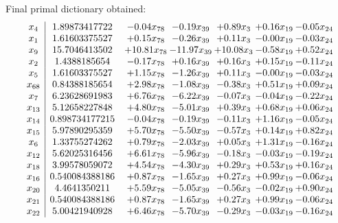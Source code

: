 \documentclass[8pt]{article}
\begin{document}
 Final primal dictionary obtained: 
\[\begin{array}{c| c c@{\hskip 2pt} c@{\hskip 2pt} c@{\hskip 2pt} c@{\hskip 2pt} c@{\hskip 2pt} }
 x_{4}   &  1.89873417722 & -0.04 x_{78} & -0.19 x_{39} & +  0.89 x_{3} & +  0.16 x_{19} & -0.05 x_{24}\\
 x_{1}   &  1.61603375527 & +  0.15 x_{78} & -0.26 x_{39} & +  0.11 x_{3} & -0.00 x_{19} & -0.03 x_{24}\\
 x_{9}   &  15.7046413502 & + 10.81 x_{78} & -11.97 x_{39} & + 10.08 x_{3} & -0.58 x_{19} & +  0.52 x_{24}\\
 x_{2}   &  1.4388185654 & -0.17 x_{78} & +  0.16 x_{39} & +  0.16 x_{3} & +  0.15 x_{19} & -0.11 x_{24}\\
 x_{5}   &  1.61603375527 & +  1.15 x_{78} & -1.26 x_{39} & +  0.11 x_{3} & -0.00 x_{19} & -0.03 x_{24}\\
 x_{68}   &  0.84388185654 & +  2.98 x_{78} & -1.08 x_{39} & -0.38 x_{3} & +  0.51 x_{19} & +  0.09 x_{24}\\
 x_{7}   &  6.23628691983 & +  6.76 x_{78} & -6.22 x_{39} & -0.07 x_{3} & -0.04 x_{19} & -0.22 x_{24}\\
 x_{13}   &  5.12658227848 & +  4.80 x_{78} & -5.01 x_{39} & +  0.39 x_{3} & +  0.68 x_{19} & +  0.06 x_{24}\\
 x_{14}   &  0.898734177215 & -0.04 x_{78} & -0.19 x_{39} & -0.11 x_{3} & +  1.16 x_{19} & -0.05 x_{24}\\
 x_{15}   &  5.97890295359 & +  5.70 x_{78} & -5.50 x_{39} & -0.57 x_{3} & +  0.14 x_{19} & +  0.82 x_{24}\\
 x_{6}   &  1.33755274262 & +  0.79 x_{78} & -2.03 x_{39} & +  0.05 x_{3} & +  1.31 x_{19} & -0.16 x_{24}\\
 x_{12}   &  5.62025316456 & +  6.61 x_{78} & -5.96 x_{39} & -0.18 x_{3} & -0.03 x_{19} & -0.19 x_{24}\\
 x_{18}   &  3.99578059072 & +  4.54 x_{78} & -4.30 x_{39} & +  0.29 x_{3} & +  0.53 x_{19} & +  0.16 x_{24}\\
 x_{16}   &  0.540084388186 & +  0.87 x_{78} & -1.65 x_{39} & +  0.27 x_{3} & +  0.99 x_{19} & -0.06 x_{24}\\
 x_{20}   &  4.4641350211 & +  5.59 x_{78} & -5.05 x_{39} & -0.56 x_{3} & -0.02 x_{19} & +  0.90 x_{24}\\
 x_{21}   &  0.540084388186 & +  0.87 x_{78} & -1.65 x_{39} & +  0.27 x_{3} & +  0.99 x_{19} & -0.06 x_{24}\\
 x_{22}   &  5.00421940928 & +  6.46 x_{78} & -5.70 x_{39} & -0.29 x_{3} & -0.03 x_{19} & -0.16 x_{24}\\

\end{array}\]
\end{document}
